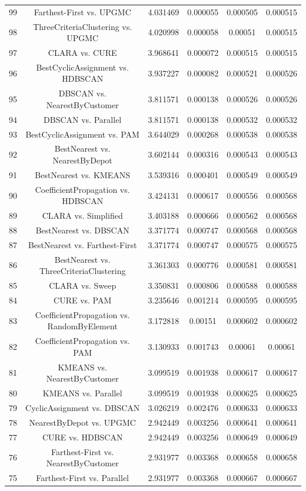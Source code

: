 \documentclass[a4paper,10pt]{article}
\begin{document}
\begin{landscape}
\begin{table}[!htp]
\begin{tabular}{cccccc}
99&Farthest-First vs. UPGMC&4.031469&0.000055&0.000505&0.000515\\
98&ThreeCriteriaClustering vs. UPGMC&4.020998&0.000058&0.00051&0.000515\\
97&CLARA vs. CURE&3.968641&0.000072&0.000515&0.000515\\
96&BestCyclicAssignment vs. HDBSCAN&3.937227&0.000082&0.000521&0.000526\\
95&DBSCAN vs. NearestByCustomer&3.811571&0.000138&0.000526&0.000526\\
94&DBSCAN vs. Parallel&3.811571&0.000138&0.000532&0.000532\\
93&BestCyclicAssignment vs. PAM&3.644029&0.000268&0.000538&0.000538\\
92&BestNearest vs. NearestByDepot&3.602144&0.000316&0.000543&0.000543\\
91&BestNearest vs. KMEANS&3.539316&0.000401&0.000549&0.000549\\
90&CoefficientPropagation vs. HDBSCAN&3.424131&0.000617&0.000556&0.000568\\
89&CLARA vs. Simplified&3.403188&0.000666&0.000562&0.000568\\
88&BestNearest vs. DBSCAN&3.371774&0.000747&0.000568&0.000568\\
87&BestNearest vs. Farthest-First&3.371774&0.000747&0.000575&0.000575\\
86&BestNearest vs. ThreeCriteriaClustering&3.361303&0.000776&0.000581&0.000581\\
85&CLARA vs. Sweep&3.350831&0.000806&0.000588&0.000588\\
84&CURE vs. PAM&3.235646&0.001214&0.000595&0.000595\\
83&CoefficientPropagation vs. RandomByElement&3.172818&0.00151&0.000602&0.000602\\
82&CoefficientPropagation vs. PAM&3.130933&0.001743&0.00061&0.00061\\
81&KMEANS vs. NearestByCustomer&3.099519&0.001938&0.000617&0.000617\\
80&KMEANS vs. Parallel&3.099519&0.001938&0.000625&0.000625\\
79&CyclicAssignment vs. DBSCAN&3.026219&0.002476&0.000633&0.000633\\
78&NearestByDepot vs. UPGMC&2.942449&0.003256&0.000641&0.000641\\
77&CURE vs. HDBSCAN&2.942449&0.003256&0.000649&0.000649\\
76&Farthest-First vs. NearestByCustomer&2.931977&0.003368&0.000658&0.000658\\
75&Farthest-First vs. Parallel&2.931977&0.003368&0.000667&0.000667\\

\end{tabular}
\end{table}
\end{landscape}
\end{document}
